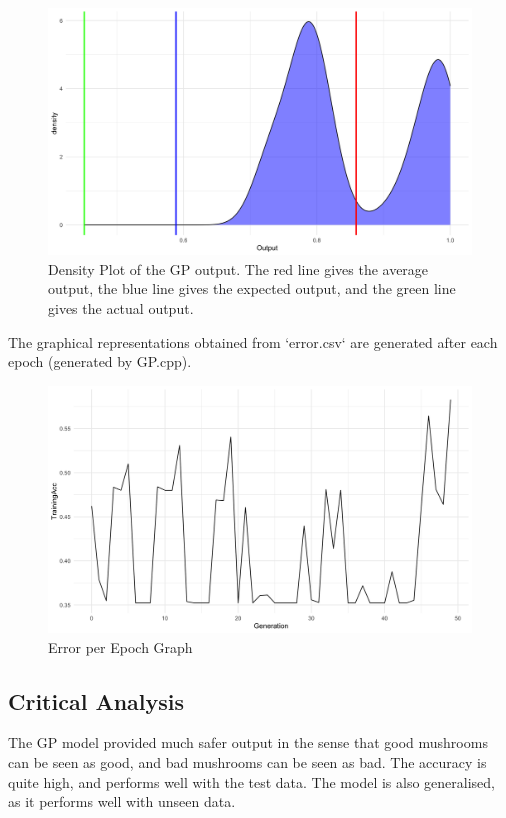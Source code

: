 \documentclass{article}
\begin{document}
    \begin{figure}[H]
        \includegraphics[width=\linewidth]{GP_density.png}
        \caption{Density Plot of the GP output. The red line gives the average output, the blue line gives the expected output, and the green line gives the actual output.}
        \label{fig:sa}
    \end{figure}

The graphical representations obtained from `error.csv` are generated after each epoch (generated by GP.cpp).
    \begin{figure}[H]
        \includegraphics[width=\linewidth]{GP_trainingacc.png}
        \caption{Error per Epoch Graph}
        \label{fig:epoch}
    \end{figure}

\subsection{Critical Analysis}
The GP model provided much safer output in the sense that good mushrooms can be seen as good, and bad mushrooms can be seen as bad. The accuracy is quite high, and performs well with the test data. The model is also generalised, as it performs well with unseen data.
\end{document}
